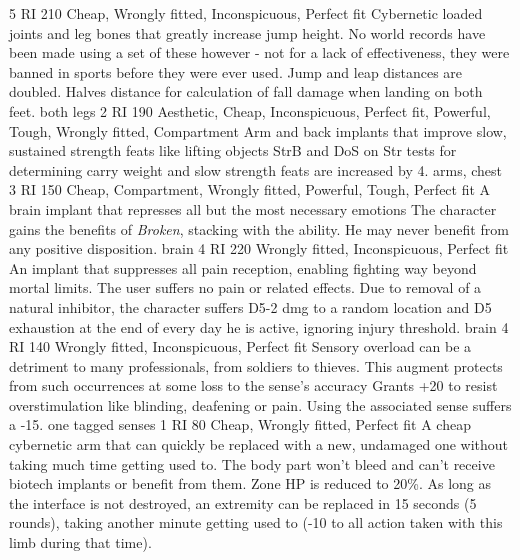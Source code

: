 \begin{multicols}{2}
    {5 RI}
    {210}
    {Cheap, Wrongly fitted, Inconspicuous, Perfect fit}
    {Cybernetic loaded joints and leg bones that greatly increase jump height. No world records have been made using a set of these however - not for a lack of effectiveness, they were banned in sports before they were ever used.}
    {Jump and leap distances are doubled. Halves distance for calculation of fall damage when landing on both feet.}
    {both legs}
    {2 RI}
    {190}
    {Aesthetic, Cheap, Inconspicuous, Perfect fit, Powerful, Tough, Wrongly fitted, Compartment}
    {Arm and back implants that improve slow, sustained strength feats like lifting objects}
    {StrB and DoS on Str tests for determining carry weight and slow strength feats are increased by 4.}
    {arms, chest}
    {3 RI}
    {150}
    {Cheap, Compartment, Wrongly fitted, Powerful, Tough, Perfect fit}
    {A brain implant that represses all but the most necessary emotions}
    {The character gains the benefits of \emph{Broken}, stacking with the ability. He may never benefit from any positive disposition.}
    {brain}
    {4 RI}
    {220}
    {Wrongly fitted, Inconspicuous, Perfect fit}
    {An implant that suppresses all pain reception, enabling fighting way beyond mortal limits.}
    {The user suffers no pain or related effects.
	   Due to removal of a natural inhibitor, the character suffers D5-2 dmg to a random location and D5 exhaustion at the end of every day he is active, ignoring injury threshold.}
    {brain}
    {4 RI}
    {140}
    {Wrongly fitted, Inconspicuous, Perfect fit}
    {Sensory overload can be a detriment to many professionals, from soldiers to thieves. This augment protects from such occurrences at some loss to the sense's accuracy}
    {Grants +20 to resist overstimulation like blinding, deafening or pain. Using the associated sense suffers a -15.}
    {one tagged senses}
    {1 RI}
    {80}
    {Cheap, Wrongly fitted, Perfect fit}
    {A cheap cybernetic arm that can quickly be replaced with a new, undamaged one without taking much time getting used to.}
    {The body part won't bleed and can't receive biotech implants or benefit from them.
	   Zone HP is reduced to 20\%. As long as the interface is not destroyed, an extremity can be replaced in 15 seconds (5 rounds), taking another minute getting used to (-10 to all action taken with this limb during that time).
}
\end{multicols}
